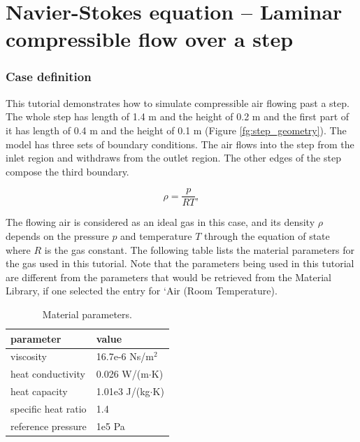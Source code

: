 \chapter{Navier-Stokes equation -- Laminar compressible flow over a step}



\subsection*{Case definition}

This tutorial demonstrates how to simulate compressible air flowing past a step. The whole step has length of 1.4 m and the height of 0.2 m and the first part of it has length of 0.4 m and the height of 0.1 m (Figure \ref{fg:step_geometry}). The model has three sets of boundary conditions. The air flows into the step from the inlet region and withdraws from the outlet region. The other edges of the step compose the third boundary.\\

\begin{figure}
\begin{displaymath}
\rho = \frac{p}{RT},
\end{displaymath}
\end{figure}

The flowing air is considered as an ideal gas in this case, and its density $\rho$  depends on the pressure $p$ and temperature $T$ through the equation of state where $R$ is the gas constant.  The following table lists the material parameters for the gas used in this tutorial.  Note that the parameters being used in this tutorial are different from the parameters that would be retrieved from the Material Library, if one selected the entry for `Air (Room Temperature).\\

\begin{table}[h]
\caption{Material parameters.}
\label{tb:matpam}
\begin{center}
\begin{tabular}{ll} \hline
parameter  & value \\ \hline
viscosity & 16.7e-6 Ns/m$^{2}$  \\
heat conductivity & 0.026 W/(m$\cdot$K) \\
heat capacity & 1.01e3 J/(kg$\cdot$K) \\
specific heat ratio & 1.4        \\
reference pressure & 1e5 Pa      \\ \hline
\end{tabular}
\end{center}
\end{table}

